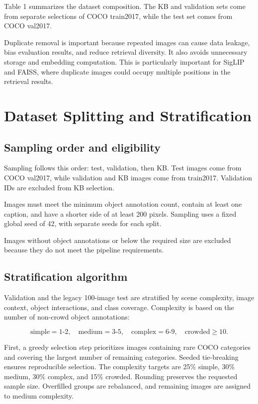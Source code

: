 \documentclass{article}
\begin{document}
Table 1 summarizes the dataset composition. The KB and validation
sets come from separate selections of COCO train2017, while the test
set comes from COCO val2017.

Duplicate removal is important because repeated images can cause data
leakage, bias evaluation results, and reduce retrieval diversity.
It also avoids unnecessary storage and embedding computation.
This is particularly important for SigLIP and FAISS, where duplicate
images could occupy multiple positions in the retrieval results.


\section{Dataset Splitting and
Stratification}\label{dataset-splitting-and-stratification}

\subsection{Sampling order and
eligibility}\label{sampling-order-and-eligibility}

Sampling follows this order: test, validation, then KB. Test images
come from COCO val2017, while validation and KB images come from
train2017. Validation IDs are excluded from KB selection.

Images must meet the minimum object annotation count, contain at least
one caption, and have a shorter side of at least 200 pixels. Sampling
uses a fixed global seed of 42, with separate seeds for each split.

Images without object annotations or below the required size are
excluded because they do not meet the pipeline requirements.

\subsection{Stratification
algorithm}\label{stratification-algorithm}

Validation and the legacy 100-image test are stratified by scene complexity, image context,
object interactions, and class coverage. Complexity is based on the
number of non-crowd object annotations:

\[
\text{simple}=1\text{-}2,\quad
\text{medium}=3\text{-}5,\quad
\text{complex}=6\text{-}9,\quad
\text{crowded}\geq10.
\]

First, a greedy selection step prioritizes images containing rare COCO
categories and covering the largest number of remaining categories.
Seeded tie-breaking ensures reproducible selection. The complexity
targets are 25\% simple, 30\% medium, 30\% complex, and 15\% crowded.
Rounding preserves the requested sample size. Overfilled groups are
rebalanced, and remaining images are assigned to medium complexity.
\end{document}
